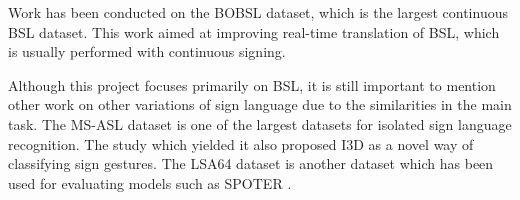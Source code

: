 \documentclass[final,dissertation.tex]{subfiles}
\begin{document}
Work has been conducted on the BOBSL\cite{albanie2021bbc} dataset, which is the largest continuous BSL dataset. This work aimed at improving real-time translation of BSL, which is usually performed with continuous signing.

Although this project focuses primarily on BSL, it is still important to mention other work on other variations of sign language due to the similarities in the main task. The MS-ASL dataset \cite{joze2018ms} is one of the largest datasets for isolated sign language recognition. The study which yielded it also proposed I3D as a novel way of classifying sign gestures. The LSA64 dataset \cite{ronchetti2016lsa64} is another dataset which has been used for evaluating models such as SPOTER \cite{bohavcek2022sign}.
\end{document}
